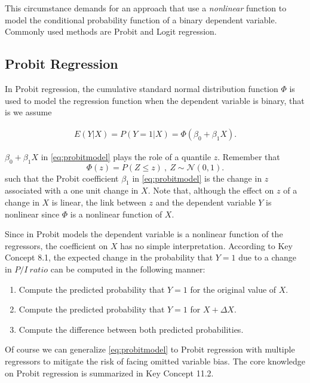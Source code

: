 \documentclass[]{book}
\providecommand{\tightlist}{%
  \setlength{\itemsep}{0pt}\setlength{\parskip}{0pt}}
\theoremstyle{definition}
\theoremstyle{definition}
\theoremstyle{definition}
\theoremstyle{remark}
\begin{document}
This circumstance demands for an approach that use a \emph{nonlinear}
function to model the conditional probability function of a binary
dependent variable. Commonly used methods are Probit and Logit
regression.

\subsection*{Probit Regression}\label{probit-regression}

In Probit regression, the cumulative standard normal distribution
function \(\Phi\) is used to model the regression function when the
dependent variable is binary, that is we assume

\begin{align}
  E(Y\vert X) = P(Y=1\vert X) = \Phi(\beta_0 + \beta_1 X). \label{eq:probitmodel}
\end{align}

\(\beta_0 + \beta_1 X\) in \eqref{eq:probitmodel} plays the role of a
quantile \(z\). Remember that
\[\Phi(z) = P(Z \leq z) \ , \ Z \sim \mathcal{N}(0,1).\] such that the
Probit coefficient \(\beta_1\) in \eqref{eq:probitmodel} is the change in
\(z\) associated with a one unit change in \(X\). Note that, although
the effect on \(z\) of a change in \(X\) is linear, the link between
\(z\) and the dependent variable \(Y\) is nonlinear since \(\Phi\) is a
nonlinear function of \(X\).

Since in Probit models the dependent variable is a nonlinear function of
the regressors, the coefficient on \(X\) has no simple interpretation.
According to Key Concept 8.1, the expected change in the probability
that \(Y=1\) due to a change in \(P/I \ ratio\) can be computed in the
following manner:

\begin{enumerate}
\def\labelenumi{\arabic{enumi}.}
\tightlist
\item
  Compute the predicted probability that \(Y=1\) for the original value
  of \(X\).
\item
  Compute the predicted probability that \(Y=1\) for \(X + \Delta X\).
\item
  Compute the difference between both predicted probabilities.
\end{enumerate}

Of course we can generalize \eqref{eq:probitmodel} to Probit regression
with multiple regressors to mitigate the risk of facing omitted variable
bias. The core knowledge on Probit regression is summarized in Key
Concept 11.2.
\end{document}
